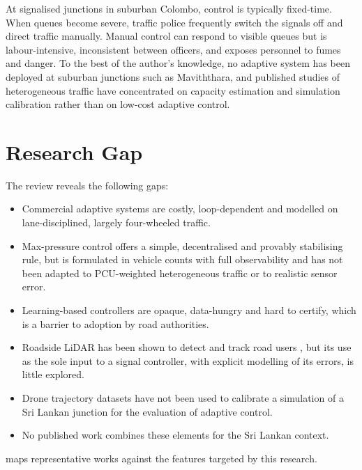 At signalised junctions in suburban Colombo, control is typically fixed-time. When queues become severe, traffic
police frequently switch the signals off and direct traffic manually. Manual control can respond to visible
queues but is labour-intensive, inconsistent between officers, and exposes personnel to fumes and danger. To the
best of the author's knowledge, no adaptive system has been deployed at suburban junctions such as Maviththara,
and published studies of heterogeneous traffic have concentrated on capacity estimation and simulation
calibration \cite{irc106,mathew2010calibration} rather than on low-cost adaptive control.

\section{Research Gap}\label{sec:lit-gap}
The review reveals the following gaps:
\begin{itemize}[leftmargin=*,itemsep=2pt]
  \item Commercial adaptive systems \cite{hunt1981scoot,sims1980scats,gartner1983opac,mirchandani2001rhodes,xie2012surtrac}
        are costly, loop-dependent and modelled on lane-disciplined, largely four-wheeled traffic.
  \item Max-pressure control \cite{varaiya2013maxpressure,kouvelas2014maxpressure,gregoire2015capacity} offers a
        simple, decentralised and provably stabilising rule, but is formulated in vehicle counts with full
        observability and has not been adapted to PCU-weighted heterogeneous traffic or to realistic sensor error.
  \item Learning-based controllers \cite{genders2016drl,wei2018intellilight} are opaque, data-hungry and hard to
        certify, which is a barrier to adoption by road authorities.
  \item Roadside LiDAR has been shown to detect and track road users \cite{zhao2019lidar,lv2019lidar}, but its
        use as the sole input to a signal controller, with explicit modelling of its errors, is little explored.
  \item Drone trajectory datasets \cite{krajewski2018highd,barmpounakis2020pneuma} have not been used to calibrate
        a simulation of a Sri Lankan junction for the evaluation of adaptive control.
  \item No published work combines these elements for the Sri Lankan context.
\end{itemize}
 maps representative works against the features targeted by this research.

